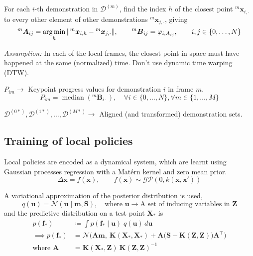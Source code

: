 For each \( i \)-th demonstration in \( \mathcal{D}^{(m)} \), find the index \( h \) of the closest point \( {}^{m}\boldsymbol{x}_{i, \cdot} \) to every other element of other demonstrations \( {}^{m}\boldsymbol{x}_{j, \cdot} \), giving
\begin{equation}
    {}^{m}\boldsymbol{A}_{ij} = \operatorname*{arg\,min}_{h} \Vert {}^{m}\boldsymbol{x}_{i, h} - {}^{m}\boldsymbol{x}_{j, \cdot} \Vert
    , \qquad
    {}^{m}\boldsymbol{B}_{ij} = \varphi_{i, A_{ij}}
    , \qquad
    i, j \in \{ 0, \ldots, N \}
\end{equation}

\textit{Assumption:} In each of the local frames, the closest point in space must have happened at the same (normalized) time.
Don't use dynamic time warping (DTW).

\( P_{im} \to \) Keypoint progress values for demonstration \( i \) in frame \( m \).
\begin{equation}
    P_{im} = \operatorname{median}({}^{m}\boldsymbol{B}_{i\cdot}), \quad \forall i \in \{ 0, \ldots, N \}, \forall m \in \{ 1, \ldots, M \}
\end{equation}

\( \mathcal{D}^{(0*)}, \mathcal{D}^{(1*)}, \ldots, \mathcal{D}^{(M*)} \to \) Aligned (and transformed) demonstration sets.

\subsection{Training of local policies}\label{sec:local-policies}

Local policies are encoded as a dynamical system, which are learnt using Gaussian processes regression with a Mat\'{e}rn kernel and zero mean prior.
\begin{equation}
    \Delta \boldsymbol{x} = f(\boldsymbol{x})
    , \qquad
    f(\boldsymbol{x}) \sim \mathcal{GP}(0, k(\boldsymbol{x}, \boldsymbol{x}'))
\end{equation}

A variational approximation of the posterior distribution is used,
\begin{equation}
    q(\boldsymbol{u}) = \mathcal{N}(\boldsymbol{u} \mid \boldsymbol{m}, \boldsymbol{S}), \quad \text{where } \boldsymbol{u} \to \text{A set of inducing variables in } \boldsymbol{Z}
\end{equation}
and the predictive distribution on a test point \( \boldsymbol{X}_* \) is
\begin{align}
    p(\boldsymbol{f}_*)
     & \coloneq
    \int p(\boldsymbol{f}_* \mid \boldsymbol{u}) \; q(\boldsymbol{u}) \, d\boldsymbol{u}
    \\
    \implies
    p(\boldsymbol{f}_*)
     & =
    \mathcal{N} \Big( \boldsymbol{A} \boldsymbol{m}, \ \boldsymbol{K}(\boldsymbol{X}_*, \boldsymbol{X}_*) + \boldsymbol{A} \big( \boldsymbol{S} - \boldsymbol{K}(\boldsymbol{Z}, \boldsymbol{Z}) \big) \boldsymbol{A}^\top \Big)
    \\
    \text{where }
    \boldsymbol{A}
     & =
    \boldsymbol{K}(\boldsymbol{X}_*, \boldsymbol{Z}) \ {\boldsymbol{K}(\boldsymbol{Z}, \boldsymbol{Z})}^{-1}
\end{align}

